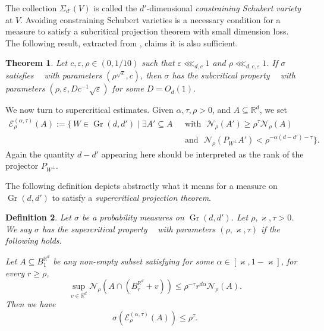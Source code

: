 \documentclass[11pt, leqno, fleqn]{amsart}
\def\eps{\varepsilon}
\def\cN{          \mathcal N}
\def\cE{          \mathcal E}
\def\clr{   \color{red}}
\def \R{{\mathbb R}}
\DeclareMathOperator{\Gr}{Gr}
\DeclareMathOperator{\SubP}{(S^{-})}
\DeclareMathOperator{\SupP}{(S^+)}
\DeclareMathOperator{\NCSub}{(NC^{-})}
\newtheorem{thm}{\bf Theorem}[section]
\newtheorem{defi}[thm]{\bf Definition}
\theoremstyle{definition}
\theoremstyle{definition}
\begin{document}
		 The collection $\Sigma_{d'}(V)$ is called the $d'$-dimensional \emph{constraining Schubert variety} at $V$. Avoiding constraining Schubert varieties is a necessary condition for a measure to satisfy a subcritical projection theorem with  small dimension loss. The following result, extracted from \cite[Theorem 4.1]{BH2}, claims it is also sufficient.
		  
		 \begin{thm}  \label{lem NC-toS-} 
 		 		Let $c, \eps, \rho \in (0, 1/10)$ such that $\eps \lll_{d,c}1$ and $\rho\lll_{d,c, \eps}1$.  
		 	  If $\sigma$ satisfies $\NCSub$ with parameters $(\rho^{\sqrt{\eps}}, c)$, then $\sigma$ has the subcritical property $\SubP$ with  parameters $(\rho, \eps, D  c^{-1} \sqrt{\eps})$  for some   $D=  O_{d}(1)$.
		 \end{thm}
		 
 
		 
		 We now turn to supercritical estimates. Given $\alpha, \tau, \rho>0$, and $A\subseteq \R^d$, we set   
		 \begin{equation} \label{notation-cEaed} 
		 	\begin{split} 
		 		\cE^{(\alpha, \tau)}_{\rho}(A) := \Big \{\, W\in \Gr(d, d') \mid  \exists A' \subseteq A \,\,&\text{ with }\,\,\cN_{\rho}(A')\geq \rho^\tau \cN_{\rho}(A)\\
		 		& \text{ and }\, \,\cN_{\rho}(P_{W^{\perp}}A') < \rho^{- \alpha (d-d')  -\tau}\Big \}.
		 	\end{split}
		 \end{equation}
		 Again the quantity 	$d-d'$ appearing here should be interpreted as the rank of the  projector $P_{W^{\perp}}$. 
		 
		 The following definition depicts abstractly what it means for a measure on $\Gr(d,d')$ to satisfy a {\it supercritical projection theorem}.
		 
		 \begin{defi}  \label{SAP} 
		 	Let $\sigma$ be a  probability measures on $\Gr(d, d')$. Let $\rho, \varkappa, \tau>0$.  We say $\sigma$ has the \emph{supercritical  property} $\SupP$ with parameters $(\rho, \varkappa,\tau)$ if the following holds.
		 	
		 	Let $A\subseteq B^{\R^d}_{1}$ be any non-empty subset satisfying for some
		 	$\alpha\in[\varkappa, 1-\varkappa]$, for every $r \geq \rho$,
		 	\begin{equation}\label{nc-dim-dalpha}
		 		\sup_{v \in \R^d} \cN_\rho(A \cap (B^{\R^d}_r + v)) \leq \rho^{-\tau} r^{d \alpha } \cN_\rho(A).
		 	\end{equation}
 Then we have
		 	$$\sigma(\cE^{(\alpha, \tau)}_{\rho}(A)) \leq \rho^\tau.$$  
		 \end{defi}
		 
\end{document}
